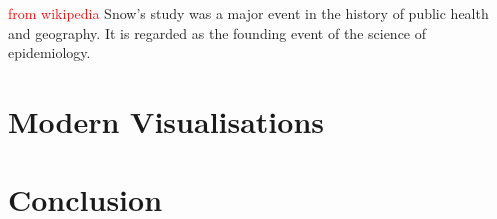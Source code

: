 \documentclass[12pt]{article}
\newcommand\todo[1]{\textcolor{red}{#1}}
\begin{document}
\todo{from wikipedia}
Snow's study was a major event in the history of public health and geography. It is regarded as the founding event of the science of epidemiology.


\section{Modern Visualisations}

\section{Conclusion}

% 
% 



\end{document}
